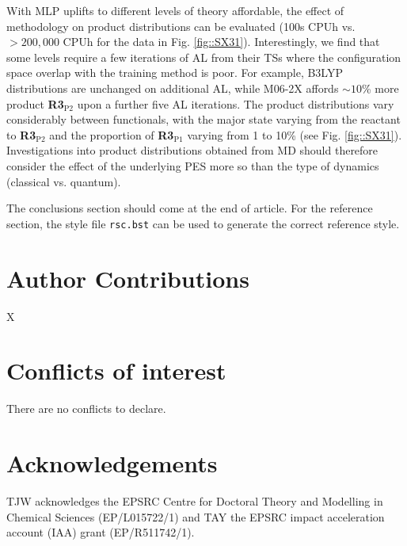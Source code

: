 \documentclass[twoside,twocolumn,9pt]{article}
\begin{document}
With MLP uplifts to different levels of theory affordable, the effect of methodology on product distributions can be evaluated (100s CPUh vs. $>200,000$ CPUh for the data in Fig. \ref{fig::SX31}).  Interestingly, we find that some levels require a few iterations of AL from their TSs where the configuration space overlap with the training method is poor. For example, B3LYP distributions are unchanged on additional AL, while M06-2X affords $\sim10$\% more product {\bfseries{R3$_\text{P2}$}} upon a further five AL iterations. The product distributions vary considerably between functionals, with the major state varying from the reactant to {\bfseries{R3$_\text{P2}$}} and the proportion of {\bfseries{R3$_\text{P1}$}} varying from 1 to 10\% (see Fig. \ref{fig::SX31}). Investigations into product distributions obtained from MD should therefore consider the effect of the underlying PES more so than the type of dynamics (classical vs. quantum).









\vspace{0.2cm}
The conclusions section should come at the end of article. For the reference section, the style file \texttt{rsc.bst} can be used to generate the correct reference style.



\section*{Author Contributions}
X

\section*{Conflicts of interest}
There are no conflicts to declare.

\section*{Acknowledgements}
TJW acknowledges the EPSRC Centre for Doctoral Theory and Modelling in Chemical Sciences (EP/L015722/1) and TAY the EPSRC impact acceleration account (IAA) grant (EP/R511742/1). 



\end{document}
